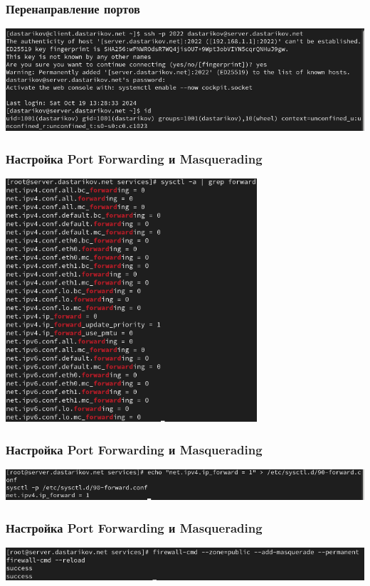 \begin{frame}
\frametitle{Перенаправление портов}
    \includegraphics[width=\textwidth]{../images/image06.png}
\end{frame}


\begin{frame}
\frametitle{Настройка Port Forwarding и Masquerading}
    \centering
    \includegraphics[width=0.7\textwidth]{../images/image07.png}
\end{frame}

\begin{frame}
\frametitle{Настройка Port Forwarding и Masquerading}
    \includegraphics[width=\textwidth]{../images/image09.png}
\end{frame}

\begin{frame}
\frametitle{Настройка Port Forwarding и Masquerading}
    \includegraphics[width=\textwidth]{../images/image10.png}
\end{frame}

